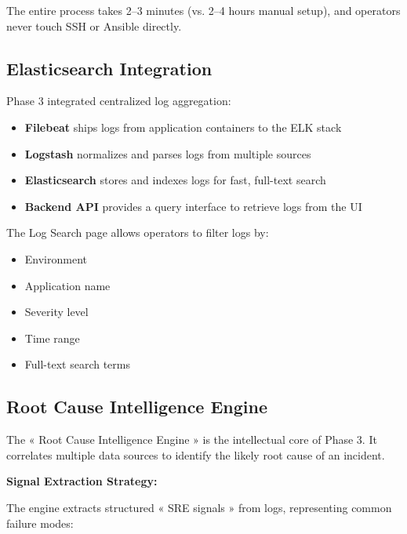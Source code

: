 \documentclass[12pt,a4paper]{report}
\begin{document}
The entire process takes 2–3 minutes (vs. 2–4 hours manual setup), and operators never touch SSH or Ansible directly.

\subsection{Elasticsearch Integration}

Phase 3 integrated centralized log aggregation:

\begin{itemize}
  \item \textbf{Filebeat} ships logs from application containers to the ELK stack
  \item \textbf{Logstash} normalizes and parses logs from multiple sources
  \item \textbf{Elasticsearch} stores and indexes logs for fast, full-text search
  \item \textbf{Backend API} provides a query interface to retrieve logs from the UI
\end{itemize}

The Log Search page allows operators to filter logs by:
\begin{itemize}
  \item Environment
  \item Application name
  \item Severity level
  \item Time range
  \item Full-text search terms
\end{itemize}

\subsection{Root Cause Intelligence Engine}

The « Root Cause Intelligence Engine » is the intellectual core of Phase 3. It correlates multiple data sources to identify the likely root cause of an incident.

\textbf{Signal Extraction Strategy:}

The engine extracts structured « SRE signals » from logs, representing common failure modes:
\end{document}
